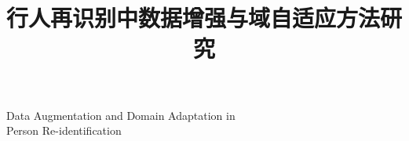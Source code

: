 \studentsn{}
\author{}
\title{行人再识别中数据增强与域自适应方法研究}
%
{Data Augmentation and Domain Adaptation in \\ Person Re-identification}
\advisor{}{}
\appraiser{--}

\team{ \qquad  \qquad}
\fundteam{   \qquad  \qquad             }
\lab{\qquad \qquad }
